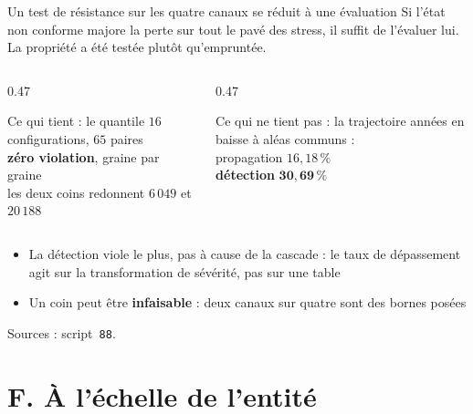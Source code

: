 \documentclass[11pt]{beamer}
\begin{document}
\begin{frame}{Un test de résistance sur les quatre canaux se réduit à une évaluation}
\small
Si l'état non conforme majore la perte sur tout le pavé des stress, il suffit de l'évaluer lui.
La propriété a été testée plutôt qu'empruntée.
\vspace{2mm}

\begin{columns}[t]
\begin{column}{0.47\textwidth}
\begin{block}{Ce qui tient : le quantile}
\small
$16$ configurations, $65$ paires \\
\textbf{zéro violation}, graine par graine \\
les deux coins redonnent $6\,049$ et $20\,188$
\end{block}
\end{column}
\begin{column}{0.47\textwidth}
\begin{block}{Ce qui ne tient pas : la trajectoire}
\small
années en baisse à aléas communs : \\
propagation \quad $16{,}18\,\%$ \\
\textbf{détection} \quad\; $\mathbf{30{,}69\,\%}$
\end{block}
\end{column}
\end{columns}
\vspace{3mm}

\begin{itemize}\itemsep4pt
  \item La détection viole le plus, \alert{pas à cause de la cascade} : le taux de dépassement
        agit sur la transformation de sévérité, pas sur une table
  \item Un coin peut être \textbf{infaisable} : deux canaux sur quatre sont des bornes posées
\end{itemize}
\vspace{1mm}
{\scriptsize Sources : script~\texttt{88}.}
\end{frame}

\section*{F. À l'échelle de l'entité}
\end{document}
